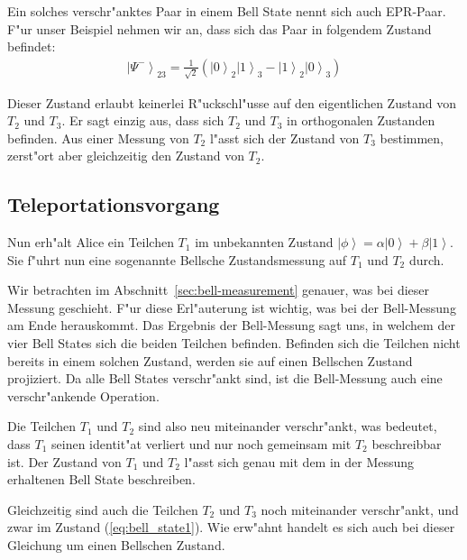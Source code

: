 \begin{refsection}
Ein solches verschr"anktes Paar in einem Bell State nennt sich auch EPR-Paar. F"ur unser Beispiel nehmen wir an, dass sich das Paar in folgendem Zustand befindet:
\begin{align}\label{eq:bell_state1}
\left|\Psi^{-}\right\rangle_{23} = \frac{1}{\sqrt{2}} ( \left|0\right\rangle_{2}\left|1\right\rangle_{3} - \left|1\right\rangle_{2}\left|0\right\rangle_{3} )
\end{align}

Dieser Zustand erlaubt keinerlei R"uckschl"usse auf den eigentlichen Zustand von $T_{2}$ und $T_{3}$. Er sagt einzig aus, dass sich $T_{2}$ und $T_{3}$ in orthogonalen Zustanden befinden. Aus einer Messung von $T_{2}$ l"asst sich der Zustand von $T_{3}$ bestimmen, zerst"ort aber gleichzeitig den Zustand von $T_{2}$. 

\subsection{Teleportationsvorgang}\label{sec:teleportation}

Nun erh"alt Alice ein Teilchen $T_{1}$ im unbekannten Zustand $\left|\phi\right\rangle = \alpha\left|0\right\rangle + \beta\left|1\right\rangle$. Sie f"uhrt nun eine sogenannte Bellsche Zustandsmessung auf $T_{1}$ und $T_{2}$ durch.

Wir betrachten im Abschnitt~\ref{sec:bell-measurement} genauer, was bei dieser Messung geschieht. F"ur diese Erl"auterung ist wichtig, was bei der Bell-Messung am Ende herauskommt. Das Ergebnis der Bell-Messung sagt uns, in welchem der vier Bell States sich die beiden Teilchen befinden. Befinden sich die Teilchen nicht bereits in einem solchen Zustand, werden sie auf einen Bellschen Zustand projiziert. Da alle Bell States verschr"ankt sind, ist die Bell-Messung auch eine verschr"ankende Operation.

Die Teilchen $T_{1}$ und $T_{2}$ sind also neu miteinander verschr"ankt, was bedeutet, dass $T_{1}$ seinen identit"at verliert und nur noch gemeinsam mit $T_{2}$ beschreibbar ist. Der Zustand von $T_{1}$ und $T_{2}$ l"asst sich genau mit dem in der Messung erhaltenen Bell State beschreiben. 

Gleichzeitig sind auch die Teilchen $T_{2}$ und $T_{3}$ noch miteinander verschr"ankt, und zwar im Zustand (\ref{eq:bell_state1}). Wie erw"ahnt handelt es sich auch bei dieser Gleichung um einen Bellschen Zustand.


\end{refsection}
